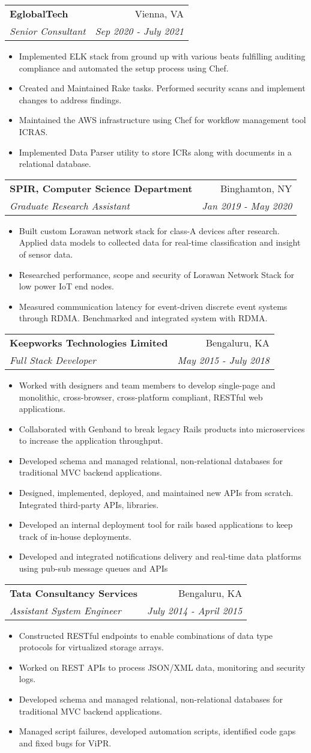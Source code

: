 \documentclass[letterpaper,11pt]{article}
\makeatletter
\newcommand{\resumeCustomItem}[1]{
  \item\small{
    {#1}
  }
}
\newcommand{\resumeSubheading}[4]{
  \vspace{-1pt}\item
    \begin{tabular*}{0.97\textwidth}[t]{l@{\extracolsep{\fill}}r}
      \textbf{#1} & #2 \\
      \textit{\small#3} & \textit{\small #4} \\
    \end{tabular*}\vspace{-5pt}
}
\newcommand{\resumeItemListStart}{\begin{itemize}}
\newcommand{\resumeItemListEnd}{\end{itemize}\vspace{-5pt}}
\makeatother
\begin{document}
    \resumeSubheading
      {EglobalTech}{Vienna, VA}
      {Senior Consultant}{Sep 2020 - July 2021}
      \resumeItemListStart
        \resumeCustomItem{Implemented ELK stack from ground up with various beats fulfilling auditing compliance and automated the setup process using Chef.}
        \resumeCustomItem{Created and Maintained Rake tasks. Performed security scans and implement changes to address findings.}
        \resumeCustomItem{Maintained the AWS infrastructure using Chef for workflow management tool ICRAS.}
        \resumeCustomItem{Implemented Data Parser utility to store ICRs along with documents in a relational database.}
      \resumeItemListEnd

    \resumeSubheading
      {SPIR, Computer Science Department}{Binghamton, NY}
      {Graduate Research Assistant}{Jan 2019 - May 2020}
      \resumeItemListStart
        \resumeCustomItem{Built custom Lorawan network stack for class-A devices after research. Applied data models to collected data for real-time classification and insight of sensor data.}
        \resumeCustomItem{Researched performance, scope and security of Lorawan Network Stack for low power IoT end nodes.}
        \resumeCustomItem{Measured communication latency for event-driven discrete event systems through RDMA. Benchmarked and integrated system with RDMA.}
      \resumeItemListEnd

    \resumeSubheading
      {Keepworks Technologies Limited}{Bengaluru, KA}
      {Full Stack Developer}{May 2015 - July 2018}
      \resumeItemListStart
        \resumeCustomItem{Worked with designers and team members to develop single-page and monolithic, cross-browser, cross-platform compliant, RESTful web applications.}
        \resumeCustomItem{Collaborated with Genband to break legacy Rails products into microservices to increase the application throughput.}
        \resumeCustomItem{Developed schema and managed relational, non-relational databases for traditional MVC backend applications.}
        \resumeCustomItem{Designed, implemented, deployed, and maintained new APIs from scratch. Integrated third-party APIs, libraries.}
        \resumeCustomItem{Developed an internal deployment tool for rails based applications to keep track of in-house deployments.}
        \resumeCustomItem{Developed and integrated notifications delivery and real-time data platforms using pub-sub message queues and APIs}
      \resumeItemListEnd

    \resumeSubheading
      {Tata Consultancy Services}{Bengaluru, KA}
      {Assistant System Engineer}{July 2014 - April 2015}
      \resumeItemListStart
        \resumeCustomItem{Constructed RESTful endpoints to enable combinations of data type protocols for virtualized storage arrays.}
        \resumeCustomItem{Worked on REST APIs to process JSON/XML data, monitoring and security logs.}
        \resumeCustomItem{Developed schema and managed relational, non-relational databases for traditional MVC backend applications.}
        \resumeCustomItem{Managed script failures, developed automation scripts, identified code gaps and fixed bugs for ViPR.}
      \resumeItemListEnd
\end{document}
